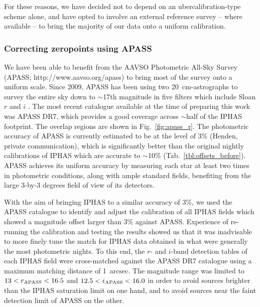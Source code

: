 \documentclass[useAMS,usenatbib]{mn2e}
\begin{document}
For these reasons, we have decided not to depend
on an ubercalibration-type scheme alone,
and have opted to involve an external reference survey
-- where available --
to bring the majority of our data onto a uniform calibration.

\subsubsection{Correcting zeropoints using APASS}

We have been able to benefit from the
AAVSO Photometric All-Sky Survey
(APASS; http://www.aavso.org/apass)
to bring most of the survey 
onto a uniform scale.
Since 2009,
APASS has been using two 20~cm-astrographs
to survey the entire sky down to $\sim$17th magnitude
in five filters which include Sloan $r$ and $i$ \citep{Henden2012}.
The most recent catalogue available 
at the time of preparing this work was APASS DR7,
which provides a good coverage across $\sim$half
of the IPHAS footprint.
The overlap regions are shown in Fig.~\ref{fig:apass_r}.
The photometric accuracy of APASS is currently estimated 
to be at the level of 3\% (Henden, private communication),
which is significantly better 
than the original nightly calibrations of IPHAS
which are accurate to $\sim$10\% (Tab.~\ref{tbl:offsets_before}).
APASS achieves its uniform accuracy 
by measuring each star at least two times in photometric conditions,
along with ample standard fields,
benefiting from the large 3-by-3 degrees field of view of its detectors.

With the aim of bringing IPHAS to a similar accuracy of 3\%,
we used the APASS catalogue to identify and adjust the calibration of all IPHAS fields 
which showed a magnitude offset larger than 3\% against APASS.  Experience of re-running
the calibration and testing the results showed us that it was inadvisable to more
finely tune the match for IPHAS data obtained in what were generally the most photometric
nights.  To this end,
the $r$- and $i$-band detection tables of each IPHAS field
were cross-matched against the APASS DR7 catalogue 
using a maximum matching distance of 1~arcsec.
The magnitude range was limited to
$13<r_{\rm APASS}<16.5$ and $12.5<i_{\rm APASS}<16.0$
in order to avoid sources 
brighter than the IPHAS saturation limit on one hand, 
and to avoid sources near the faint detection limit of APASS 
on the other.
\end{document}
